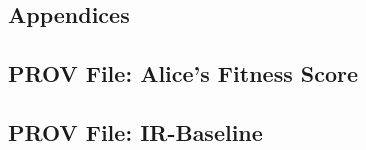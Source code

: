 \newcommand{\multipdf}[4][]{
	\label{sec:#2}
	
	
}

\newcommand{\singlepdf}[3]{
	
}

\begin{appendices}
	\stopcontents[sections]
	\chapter*{Appendices}
	\startcontents[appendix]
	\renewcommand{\thesection}{\appendixname~\Alph{section}}

	\singlepdf{Provenance Primer}{prov_primer}{pdfs/provenance-primer.pdf}

	\multipdf{Interview Questionnaire}{interview_questionnaire}{pdfs/questionnaire.pdf}

	\multipdf{Participant Information Sheet}{information_sheet}{pdfs/infosheet.pdf}

	\section{PROV File: Alice's Fitness Score}
	\label{sec:prov_file_fitness_score}
	
	

	\clearpage

	\section{PROV File: IR-Baseline}
	\label{sec:prov_file_ir_baseline}
	
	

\end{appendices}

